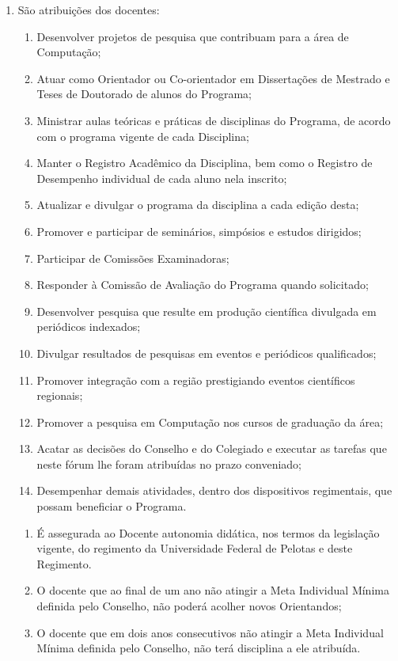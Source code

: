 \documentclass{article}
\newcommand{\grupoMenor}{Colegiado\xspace}
\newcommand{\grupoMaior}{Conselho\xspace}
\begin{document}
\begin{enumerate}
\begin{enumerate}[label=\Roman*]
	\end{enumerate}

	\item São atribuições dos docentes:
	\begin{enumerate}[label=\Roman*]
		\item 	Desenvolver projetos de pesquisa que contribuam para a área de Computação;
		\item	Atuar como Orientador ou Co-orientador em Dissertações de Mestrado e Teses de Doutorado de alunos do Programa;
		\item	Ministrar aulas teóricas e práticas de disciplinas do Programa, de acordo com o programa vigente de cada Disciplina;
		\item	Manter o Registro Acadêmico da Disciplina, bem como o Registro de Desempenho individual de cada aluno nela inscrito;
		\item	Atualizar e divulgar o programa da disciplina a cada edição desta;
		\item	Promover e participar de seminários, simpósios e estudos dirigidos;
		\item	Participar de Comissões Examinadoras;
		\item	Responder à Comissão de Avaliação do Programa quando solicitado;
		\item	Desenvolver pesquisa que resulte em produção científica divulgada em periódicos indexados;
		\item	Divulgar resultados de pesquisas em eventos e periódicos qualificados;
		\item	Promover integração com a região prestigiando eventos científicos regionais;
		\item	Promover a pesquisa em Computação nos cursos de graduação da área;
		\item	Acatar as decisões do \grupoMaior e do \grupoMenor e executar as tarefas que neste fórum lhe foram atribuídas no prazo conveniado;
		\item	Desempenhar demais atividades, dentro dos dispositivos regimentais, que possam beneficiar o Programa.
	\end{enumerate}

	\begin{enumerate}
		\item É assegurada ao Docente autonomia didática, nos termos da legislação vigente, do regimento da Universidade Federal de Pelotas e deste Regimento.

		\item O docente que ao final de um ano não atingir a Meta Individual Mínima definida pelo \grupoMaior, não poderá acolher novos Orientandos;

		\item O docente que em dois anos consecutivos não atingir a Meta Individual Mínima definida pelo \grupoMaior, não terá disciplina a ele atribuída.
	\end{enumerate}
\end{enumerate}
\end{document}
